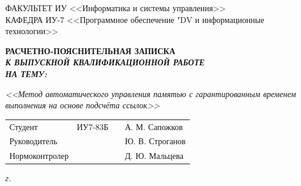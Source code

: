 \begin{titlepage}
	{
		\small \raggedright
		ФАКУЛЬТЕТ ИУ <<Информатика и системы управления>> \\
		\vspace{3.3mm}
		КАФЕДРА ИУ-7 <<Программное обеспечение "DV и информационные технологии>> \\
	}
	
	\vspace{20.8mm}
	
	{
		\LARGE \bfseries
		РАСЧЕТНО-ПОЯСНИТЕЛЬНАЯ ЗАПИСКА \\
	}
	\vspace{5mm}
	{
		\Large \bfseries \itshape
		К ВЫПУСКНОЙ КВАЛИФИКАЦИОННОЙ РАБОТЕ \\
		\vspace{5mm}
		НА ТЕМУ: \\
	}
	
	{
		\Large \itshape
		<<Метод автоматического управления памятью с гарантированным временем выполнения на основе подсчёта ссылок>>
	}
	
	\vfill
	
	\begin{tabular}{p{}PPT}
		Студент &  ИУ7-83Б & \uline{} & А. М. Сапожков \\
		Руководитель & ~ &  \uline{} & Ю. В. Строганов \\
		Нормоконтролер & ~ &  \uline{} & Д. Ю. Мальцева \\
	\end{tabular}
	
	\vspace{14mm}
	
	\textit{{\the\year} г.}
	
\end{titlepage}